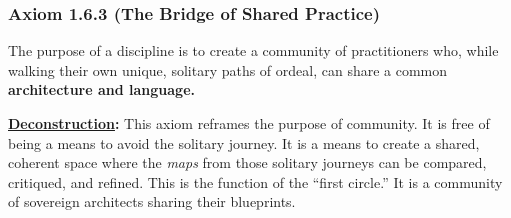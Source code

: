 \documentclass{article}
\begin{document}
\subsubsection*{Axiom 1.6.3 (The Bridge of Shared Practice)} \label{axiom_1_6_3_the_bridge_of_shared_practice}
The purpose of a discipline is to create a community of practitioners who, while walking their own unique, solitary paths of ordeal, can share a common \textbf{architecture and language.}
\begin{nobullet}
    \item \textbf{\hyperlink{gloss:deconstruction}{Deconstruction}:} This axiom reframes the purpose of community. It is free of being a means to avoid the solitary journey. It is a means to create a shared, coherent space where the \textit{maps} from those solitary journeys can be compared, critiqued, and refined. This is the function of the ``first circle.'' It is a community of sovereign architects sharing their blueprints.
\end{nobullet}
\end{document}
